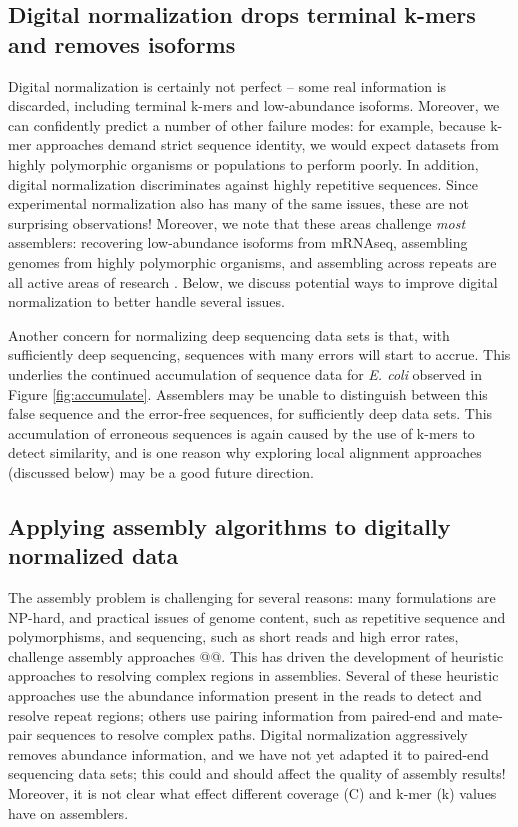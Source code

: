\documentclass[10pt]{article}
\begin{document}

\subsection*{Digital normalization drops terminal k-mers and removes isoforms}

Digital normalization is certainly not perfect -- some real
information is discarded, including terminal k-mers and low-abundance
isoforms.  Moreover, we can confidently predict a number of other
failure modes: for example, because k-mer approaches demand strict
sequence identity, we would expect datasets from highly polymorphic
organisms or populations to perform poorly.  In addition, digital
normalization discriminates against highly repetitive sequences. Since
experimental normalization also has many of the same issues, these are
not surprising observations!  Moreover, we note that these areas
challenge {\em most} assemblers: recovering low-abundance isoforms
from mRNAseq, assembling genomes from highly polymorphic organisms,
and assembling across repeats are all active areas of research
\cite{pubmed18549302,pubmed20633259,pubmed18541131}.  Below, we
discuss potential ways to improve digital normalization to better
handle several issues.

Another concern for normalizing deep sequencing data sets is that,
with sufficiently deep sequencing, sequences with many errors will
start to accrue.  This underlies the continued accumulation of
sequence data for {\em E. coli} observed in Figure
\ref{fig:accumulate}.  Assemblers may be unable to distinguish between
this false sequence and the error-free sequences, for sufficiently
deep data sets.  This accumulation of erroneous sequences is again
caused by the use of k-mers to detect similarity, and is one reason
why exploring local alignment approaches (discussed below) may be a
good future direction.

\subsection*{Applying assembly algorithms to digitally normalized data}

The assembly problem is challenging for several reasons: many
formulations are NP-hard, and practical issues of genome content, such
as repetitive sequence and polymorphisms, and sequencing, such as
short reads and high error rates, challenge assembly approaches @@.  This
has driven the development of heuristic approaches to resolving
complex regions in assemblies.  Several of these heuristic approaches
use the abundance information present in the reads to detect and
resolve repeat regions; others use pairing information from paired-end
and mate-pair sequences to resolve complex paths.  Digital
normalization aggressively removes abundance information, and we have
not yet adapted it to paired-end sequencing data sets; this could and
should affect the quality of assembly results! Moreover, it is not
clear what effect different coverage (C) and k-mer (k) values
have on assemblers.
\end{document}
